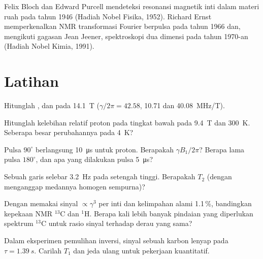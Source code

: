 \begin{history}
Felix Bloch dan Edward Purcell mendeteksi resonansi magnetik inti dalam
materi ruah pada tahun 1946 (Hadiah Nobel Fisika, 1952). Richard Ernst
memperkenalkan NMR transformasi Fourier berpulsa pada tahun 1966 dan,
mengikuti gagasan Jean Jeener, spektroskopi dua dimensi pada tahun 1970-an
(Hadiah Nobel Kimia, 1991).
\end{history}

\section{Latihan}

\begin{exercise}[$\star$]\label{exo:b3:advanced-nmr:1}
Hitunglah  ,  dan  pada \qty{14.1}{T}
($\gamma/2\pi = 42.58$, 10.71 dan \qty{40.08}{MHz/T}).
\end{exercise}

\begin{exercise}[$\star$]\label{exo:b3:advanced-nmr:2}
Hitunglah kelebihan relatif proton pada tingkat bawah pada \qty{9.4}{T} dan
\qty{300}{K}. Seberapa besar perubahannya pada \qty{4}{K}?
\end{exercise}

\begin{exercise}[$\star$]\label{exo:b3:advanced-nmr:3}
Pulsa $90^\circ$ berlangsung \qty{10}{\micro s} untuk proton. Berapakah
$\gamma B_1/2\pi$? Berapa lama pulsa $180^\circ$, dan apa yang dilakukan pulsa
\qty{5}{\micro s}?
\end{exercise}

\begin{exercise}[$\star$]\label{exo:b3:advanced-nmr:4}
Sebuah garis selebar \qty{3.2}{Hz} pada setengah tinggi. Berapakah $T_2$
(dengan menganggap medannya homogen sempurna)?
\end{exercise}

\begin{exercise}[$\star\star$]\label{exo:b3:advanced-nmr:5}
Dengan memakai sinyal $\propto\gamma^3$ per inti dan kelimpahan alami 
1.1\,\%, bandingkan kepekaan NMR ${}^{13}$C dan ${}^1$H. Berapa kali lebih banyak
pindaian yang diperlukan spektrum ${}^{13}$C untuk rasio sinyal terhadap derau
yang sama?
\end{exercise}

\begin{exercise}[$\star\star$]\label{exo:b3:advanced-nmr:6}
Dalam eksperimen pemulihan inversi, sinyal sebuah karbon lenyap pada
$\tau = \qty{1.39}{s}$. Carilah $T_1$ dan jeda ulang untuk pekerjaan kuantitatif.
\end{exercise}

